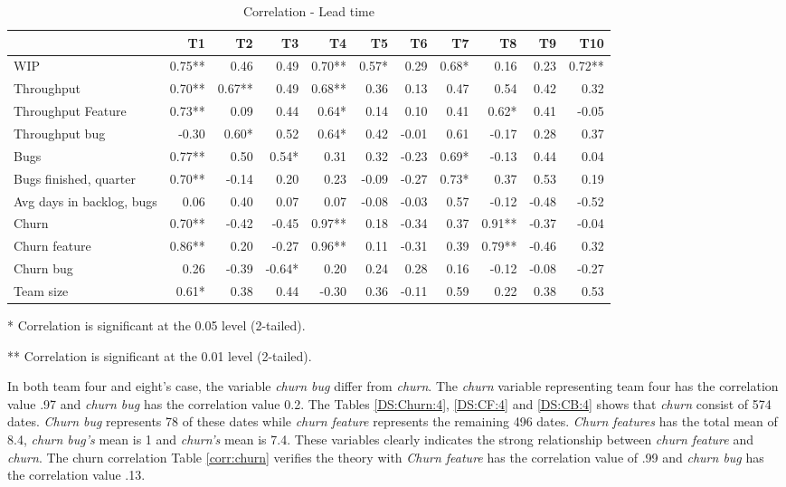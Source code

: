\documentclass[UKenglish]{ifimaster}  %
\begin{document}
\begin{table}[!htbp]
 \begin{adjustwidth}{-2.5cm}{}
 \centering
 \begin{tabular}{|l|r|r|r|r|r|r|r|r|r|r|}
\hline
 & \bf{T1} & \bf{T2} & \bf{T3} & \bf{T4} & \bf{T5} & \bf{T6} & \bf{T7} & \bf{T8} & \bf{T9} & \bf{T10}\\ \hline
 WIP  & 0.75** & 0.46 & 0.49 & 0.70** & 0.57* & 0.29 & 0.68* & 0.16 & 0.23 & 0.72** \\ \hline
 Throughput  & 0.70** & 0.67** & 0.49 & 0.68** & 0.36 & 0.13 & 0.47 & 0.54 & 0.42 & 0.32 \\ \hline
 Throughput Feature  & 0.73** & 0.09 & 0.44 & 0.64* & 0.14 & 0.10 & 0.41 & 0.62* & 0.41 & -0.05 \\ \hline
 Throughput bug  & -0.30 & 0.60* & 0.52 & 0.64* & 0.42 & -0.01 & 0.61 & -0.17 & 0.28 & 0.37 \\ \hline
 Bugs  & 0.77** & 0.50 & 0.54* & 0.31 & 0.32 & -0.23 & 0.69* & -0.13 & 0.44 & 0.04 \\ \hline
 Bugs finished, quarter  & 0.70** & -0.14 & 0.20 & 0.23 & -0.09 & -0.27 & 0.73* & 0.37 & 0.53 & 0.19 \\ \hline
 Avg days in backlog, bugs  & 0.06 & 0.40 & 0.07 & 0.07 & -0.08 & -0.03 & 0.57 & -0.12 & -0.48 & -0.52 \\ \hline
 Churn  & 0.70** & -0.42 & -0.45 & 0.97** & 0.18 & -0.34 & 0.37 & 0.91** & -0.37 & -0.04 \\ \hline
 Churn feature  & 0.86** & 0.20 & -0.27 & 0.96** & 0.11 & -0.31 & 0.39 & 0.79** & -0.46 & 0.32 \\ \hline
 Churn bug  & 0.26 & -0.39 & -0.64* & 0.20 & 0.24 & 0.28 & 0.16 & -0.12 & -0.08 & -0.27 \\ \hline
 Team size  & 0.61* & 0.38 & 0.44 & -0.30 & 0.36 & -0.11 & 0.59 & 0.22 & 0.38 & 0.53 \\ \hline
\end{tabular}
 \caption{Correlation - Lead time}
 \label{corr:lt}
 \centerline {* Correlation is significant at the 0.05 level (2-tailed).}
\centerline{** Correlation is significant at the 0.01 level (2-tailed).}
\end{adjustwidth}
\end{table}
\newpage

In both team four and eight's case, the variable \textit{churn bug} differ from \textit{churn}. The \textit{churn} variable representing team four has the correlation value .97 and  \textit{churn bug} has the correlation value 0.2. The Tables \ref{DS:Churn:4}, \ref{DS:CF:4} and \ref{DS:CB:4} shows that \textit{churn} consist of 574 dates. \textit{Churn bug} represents 78 of these dates while \textit{churn feature} represents the remaining 496 dates. \textit{Churn features} has the total mean of 8.4, \textit{churn bug's} mean is 1 and \textit{churn's} mean is 7.4. These variables clearly indicates the strong relationship between \textit{churn feature} and \textit{churn}. The churn correlation Table \ref{corr:churn} verifies the theory with \textit{Churn feature} has the correlation value of .99 and \textit{churn bug} has the correlation value .13.
\end{document}
